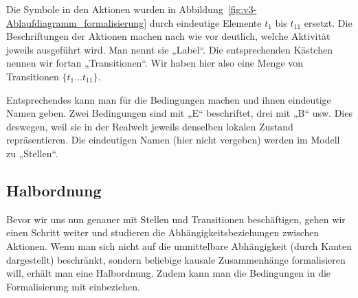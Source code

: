 Die Symbole 
in den Aktionen wurden in Abbildung~\ref{fig:v3-Ablaufdiagramm_formalisierung} durch eindeutige Elemente $t_{1}$ bis $t_{11}$ ersetzt. Die Beschriftungen der Aktionen machen nach wie vor deutlich, welche Aktivität jeweils ausgeführt wird. Man nennt sie „Label“. Die entsprechenden Kästchen nennen wir fortan „Transitionen“.
Wir haben hier also eine Menge von Transitionen $\{t_1 \ldots t_{11}\}$.

Entsprechendes kann man für die Bedingungen machen und ihnen eindeutige Namen geben. 
Zwei Bedingungen sind mit „E“ beschriftet, drei mit „B“ usw. Dies des\-wegen, weil sie in der Realwelt jeweils denselben lokalen Zustand repräsentieren. Die eindeutigen Namen (hier nicht vergeben) werden im Modell zu „Stellen“.

\subsection*{Halbordnung}
Bevor wir uns nun genauer mit Stellen und Transitionen beschäftigen, gehen wir einen Schritt weiter und studieren die Abhängigkeitsbeziehungen zwischen Aktionen. Wenn man sich nicht auf die unmittelbare Abhängigkeit (durch Kanten dargestellt) beschränkt, sondern beliebige kausale Zusammenhänge formalisieren will, erhält man eine Halbordnung. Zudem kann man die Bedingungen in die Formalisierung mit einbeziehen.


